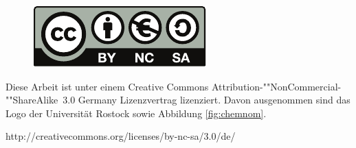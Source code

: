 \clearpage 
\setcounter{page}{2}
\vspace*{\fill}

\begin{figure}[htb]
\centering
\includegraphics[width=0.3\linewidth,keepaspectratio]{bilder/cc_by-nc-sa_eu}
\end{figure}

\begin{center}
Diese Arbeit ist unter 
einem Creative Commons Attribution-""NonCommercial-""ShareAlike~3.0 
Germany Lizenzvertrag lizenziert. Davon ausgenommen sind das Logo der 
Universität Rostock sowie Abbildung \ref{fig:chemnom}.

http://creativecommons.org/licenses/by-nc-sa/3.0/de/
\end{center}

\vspace*{\fill}
